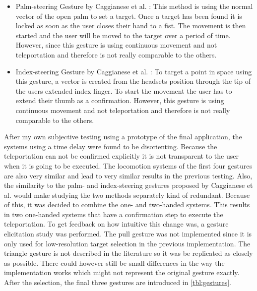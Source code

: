 \begin{itemize}
    \item Palm-steering Gesture by Caggianese et al. \cite{Caggianese}:
    This method is using the normal vector of the open palm to set a target. Once a target has been found it is locked as soon as the user closes their hand to a fist. The movement is then started and the user will be moved to the target over a period of time.
    However, since this gesture is using continuous movement and not teleportation and therefore is not really comparable to the others.
    
    \item Index-steering Gesture by Caggianese et al. \cite{Caggianese}:
    To target a point in space using this gesture, a vector is created from the headsets position through the tip of the users extended index finger. To start the movement the user has to extend their thumb as a confirmation.
    However, this gesture is using continuous movement and not teleportation and therefore is not really comparable to the others.
\end{itemize}

After my own subjective testing using a prototype of the final application, the systems using a time delay were found to be disorienting. Because the teleportation can not be confirmed explicitly it is not transparent to the user when it is going to be executed. The locomotion systems of the first four gestures are also very similar and lead to very similar results in the previous testing. Also, the similarity to the palm- and index-steering gestures proposed by Caggianese et al. would make studying the two methods separately kind of redundant. Because of this, it was decided to combine the one- and two-handed systems. This results in two one-handed systems that have a confirmation step to execute the teleportation. To get feedback on how intuitive this change was, a gesture elicitation study was performed. The pull gesture was not implemented since it is only used for low-resolution target selection in the previous implementation. The triangle gesture is not described in the literature so it was be replicated as closely as possible. There could however still be small differences in the way the implementation works which might not represent the original gesture exactly. After the selection, the final three gestures are introduced in \ref{tbl:gestures}.

